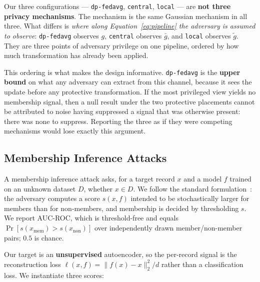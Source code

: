 Our three configurations --- \texttt{dp-fedavg}, \texttt{central},
\texttt{local} --- are \textbf{not three privacy mechanisms}. The
mechanism is the same Gaussian mechanism in all three. What differs is
\emph{where along Equation~\ref{eq:pipeline} the adversary is assumed to
observe}: \texttt{dp-fedavg} observes $g$, \texttt{central} observes
$\bar{g}$, and \texttt{local} observes $\tilde{g}$. They are three points
of adversary privilege on one pipeline, ordered by how much
transformation has already been applied.

This ordering is what makes the design informative.
\texttt{dp-fedavg} is the \textbf{upper bound} on what any adversary can
extract from this channel, because it sees the update before any
protective transformation. If the most privileged view yields no
membership signal, then a null result under the two protective placements
cannot be attributed to noise having suppressed a signal that was
otherwise present: there was none to suppress. Reporting the three as if
they were competing mechanisms would lose exactly this argument.

\subsection{Membership Inference Attacks}
\label{sec:prelim-mia}

A membership inference attack asks, for a target record $x$ and a model
$f$ trained on an unknown dataset $D$, whether $x \in D$. We follow the
standard formulation~\cite{shokri2017membership,yeom2018privacy}: the
adversary computes a score $s(x, f)$ intended to be stochastically larger
for members than for non-members, and membership is decided by
thresholding $s$. We report AUC-ROC, which is threshold-free and equals
$\Pr[s(x_{\text{mem}}) > s(x_{\text{non}})]$ over independently drawn
member/non-member pairs; $0.5$ is chance.

Our target is an \textbf{unsupervised} autoencoder, so the per-record
signal is the reconstruction loss
$\ell(x, f) = \lVert f(x) - x \rVert_2^2 / d$ rather than a classification
loss. We instantiate three scores:

